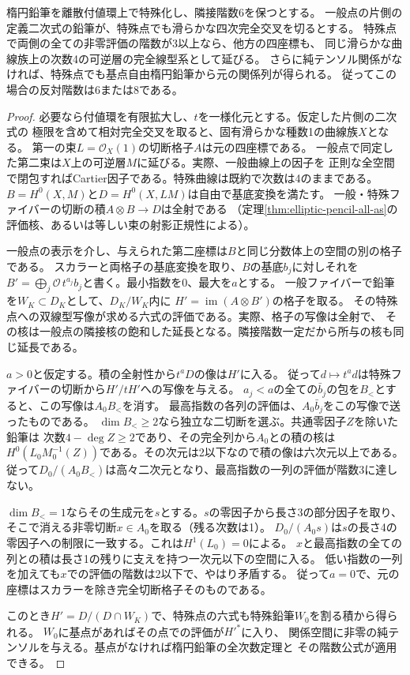 \begin{proposition}[片側が滑らかに残る特殊化]\label{prop:one-smooth-quartic-specialization}
楕円鉛筆を離散付値環上で特殊化し、隣接階数6を保つとする。
一般点の片側の定義二次式の鉛筆が、特殊点でも滑らかな四次完全交叉を切るとする。
特殊点で両側の全ての非零評価の階数が3以上なら、他方の四座標も、
同じ滑らかな曲線族上の次数4の可逆層の完全線型系として延びる。
さらに純テンソル関係がなければ、特殊点でも基点自由楕円鉛筆から元の関係列が得られる。
従ってこの場合の反対階数は6または8である。
\end{proposition}
\begin{proof}
必要なら付値環を有限拡大し、$t$を一様化元とする。仮定した片側の二次式の
極限を含めて相対完全交叉を取ると、固有滑らかな種数1の曲線族$X$となる。
第一の束$L=\mathcal O_X(1)$の切断格子$A$は元の四座標である。
一般点で同定した第二束は$X$上の可逆層$M$に延びる。実際、一般曲線上の因子を
正則な全空間で閉包すればCartier因子である。特殊曲線は既約で次数は4のままである。
$B=H^0(X,M)$と$D=H^0(X,LM)$は自由で基底変換を満たす。
一般・特殊ファイバーの切断の積$A\otimes B\to D$は全射である
（定理\ref{thm:elliptic-pencil-all-as}の評価核、あるいは等しい束の射影正規性による）。

一般点の表示を介し、与えられた第二座標は$B$と同じ分数体上の空間の別の格子である。
スカラーと両格子の基底変換を取り、$B$の基底$b_j$に対しそれを
$B'=\bigoplus_j \mathcal O\,t^{a_j}b_j$と書く。最小指数を0、最大を$a$とする。
一般ファイバーで鉛筆を$W_K\subset D_K$として、$D_K/W_K$内に
$H'=\operatorname{im}(A\otimes B')$の格子を取る。
その特殊点への双線型写像が求める六式の評価である。実際、格子の写像は全射で、
その核は一般点の隣接核の飽和した延長となる。隣接階数一定だから所与の核も同じ延長である。

$a>0$と仮定する。積の全射性から$t^aD$の像は$H'$に入る。
従って$d\mapsto t^a d$は特殊ファイバーの切断から$H'/tH'$への写像を与える。
$a_j<a$の全ての$\bar b_j$の包を$B_{<}$とすると、この写像は$A_0 B_{<}$を消す。
最高指数の各列の評価は、$A_0\bar b_j$をこの写像で送ったものである。
$\dim B_{<}\ge2$なら独立な二切断を選ぶ。共通零因子$Z$を除いた鉛筆は
次数$4-\deg Z\ge2$であり、その完全列から$A_0$との積の核は
$H^0(L_0M_0^{-1}(Z))$である。その次元は2以下なので積の像は六次元以上である。
従って$D_0/(A_0 B_{<})$は高々二次元となり、最高指数の一列の評価が階数3に達しない。

$\dim B_{<}=1$ならその生成元を$s$とする。$s$の零因子から長さ3の部分因子を取り、
そこで消える非零切断$x\in A_0$を取る（残る次数は1）。
$D_0/(A_0s)$は$s$の長さ4の零因子への制限に一致する。これは$H^1(L_0)=0$による。
$x$と最高指数の全ての列との積は長さ1の残りに支えを持つ一次元以下の空間に入る。
低い指数の一列を加えても$x$での評価の階数は2以下で、やはり矛盾する。
従って$a=0$で、元の座標はスカラーを除き完全切断格子そのものである。

このとき$H'=D/(D\cap W_K)$で、特殊点の六式も特殊鉛筆$W_0$を割る積から得られる。
$W_0$に基点があればその点での評価が$H'^*$に入り、
関係空間に非零の純テンソルを与える。基点がなければ楕円鉛筆の全次数定理と
その階数公式が適用できる。
\end{proof}

